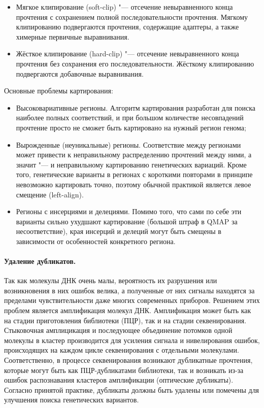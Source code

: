 \documentclass[a4paper,12pt]{article}
\begin{document}
\begin{itemize}
\item Мягкое клипирование (soft-clip) "--- отсечение невыравненного конца прочтения с сохранением полной последовательности прочтения.
Мягкому клипированию подвергаются прочтения, содержащие адаптеры, а также химерные первичные выравнивания.
\item Жёсткое клипирование (hard-clip) "--- отсечение невыравненного конца прочтения без сохранения его последовательности.
Жёсткому клипированию подвергаются добавочные выравнивания.
\end{itemize}

Основные проблемы картирования:

\begin{itemize}
\item Высоковариативные регионы.
Алгоритм картирования разработан для поиска наиболее полных соответствий, и при большом количестве несовпадений прочтение просто не сможет быть картировано на нужный регион генома;
\item Вырожденные (неуникальные) регионы.
Соответствие между регионами может привести к неправильному распределению прочтений между ними, а значит "--- и неправильному картированию генетических вариаций.
Кроме того, генетические варианты в регионах с короткими повторами в принципе невозможно картировать точно, поэтому обычной практикой является левое смещение (left-align).
\item Регионы с инсерциями и делециями.
Помимо того, что сами по себе эти варианты сильно ухудшают картирование (большой штраф в QMAP за несоответствие), края инсерций и делеций могут быть смещены в зависимости от особенностей конкретного региона.
\end{itemize}

\paragraph{Удаление дубликатов.}
Так как молекулы ДНК очень малы, вероятность их разрушения или возникновения в них ошибок велика, а полученные от них сигналы находятся за пределами чувствительности даже многих современных приборов.
Решением этих проблем является амплификация молекул ДНК.
Амплификация может быть как на стадии приготовления библиотеки (ПЦР), так и на стадии секвенирования.
Стыковочная амплицикация и последующее объединение потомков одной молекулы в кластер производится для усиления сигнала и нивелирования ошибок, происходящих на каждом цикле секвенирования с отдельными молекулами.
Соответственно, в процессе секвенирования возникают дубликатные прочтения, которые могут быть как ПЦР-дубликатами библиотеки, так и возникать из-за ошибок распознавания кластеров амплификации (оптические дубликаты).
Согласно принятой практике, дубликаты должны быть удалены или помечены для улучшения поиска генетических вариантов\cite{gatk}.
\end{document}
